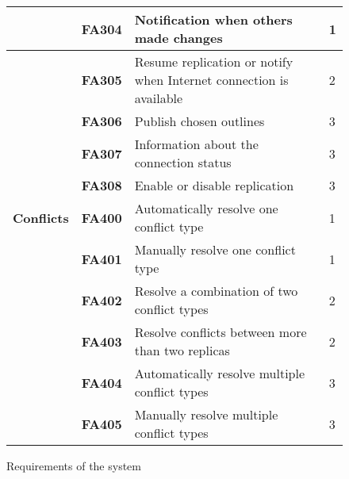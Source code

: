 \begin{figure}[H]
\begin{tabular}{ | l | l | l | l |}
    & \textbf{FA304} & Notification when others made changes & 1\\ \hline
    & \textbf{FA305} & Resume replication or notify when Internet connection is available & 2\\ \hline
    & \textbf{FA306} & Publish chosen outlines & 3\\ \hline
    & \textbf{FA307} & Information about the connection status & 3\\ \hline
    & \textbf{FA308} & Enable or disable replication & 3\\ \hline
    \hline
    \textbf{Conflicts} & \textbf{FA400} & Automatically resolve one conflict type & 1\\ \hline
    & \textbf{FA401} & Manually resolve one conflict type & 1\\ \hline
    & \textbf{FA402} & Resolve a combination of two conflict types & 2\\ \hline
    & \textbf{FA403} & Resolve conflicts between more than two replicas & 2\\ \hline
    & \textbf{FA404} & Automatically resolve multiple conflict types & 3\\ \hline
    & \textbf{FA405} & Manually resolve multiple conflict types & 3\\ \hline
    \hline
  \end{tabular}
  \caption{Requirements of the system}
  \label{figure:af}
\end{figure}

\clearpage
\setlength{\hoffset}{0mm}
